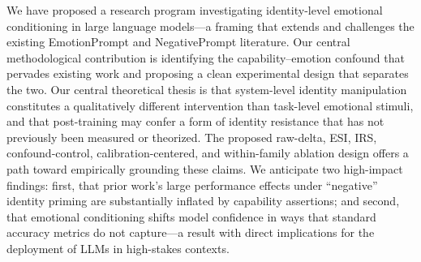 \documentclass[11pt,a4paper]{article}
\begin{document}
We have proposed a research program investigating identity-level emotional conditioning in large language models—a framing that extends and challenges the existing EmotionPrompt and NegativePrompt literature. Our central methodological contribution is identifying the capability--emotion confound that pervades existing work and proposing a clean experimental design that separates the two. Our central theoretical thesis is that system-level identity manipulation constitutes a qualitatively different intervention than task-level emotional stimuli, and that post-training may confer a form of identity resistance that has not previously been measured or theorized. The proposed raw-delta, ESI, IRS, confound-control, calibration-centered, and within-family ablation design offers a path toward empirically grounding these claims. We anticipate two high-impact findings: first, that prior work's large performance effects under ``negative'' identity priming are substantially inflated by capability assertions; and second, that emotional conditioning shifts model confidence in ways that standard accuracy metrics do not capture—a result with direct implications for the deployment of LLMs in high-stakes contexts.
\end{document}
